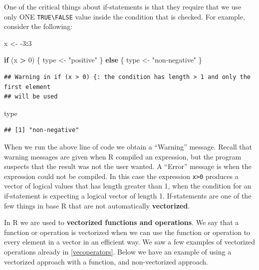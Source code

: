 \documentclass[
]{book}
\newenvironment{Shaded}{\begin{snugshade}}{\end{snugshade}}
\newcommand{\ControlFlowTok}[1]{\textcolor[rgb]{0.13,0.29,0.53}{\textbf{#1}}}
\newcommand{\DecValTok}[1]{\textcolor[rgb]{0.00,0.00,0.81}{#1}}
\newcommand{\NormalTok}[1]{#1}
\newcommand{\OperatorTok}[1]{\textcolor[rgb]{0.81,0.36,0.00}{\textbf{#1}}}
\newcommand{\StringTok}[1]{\textcolor[rgb]{0.31,0.60,0.02}{#1}}
\begin{document}
One of the critical things about if-statements is that they require that we use only ONE \texttt{TRUE\textbackslash{}FALSE} value inside the condition that is checked. For example, consider the following:

\begin{Shaded}
\begin{Highlighting}[]
\NormalTok{x <-}\StringTok{ }\DecValTok{-3}\OperatorTok{:}\DecValTok{3}

\ControlFlowTok{if}\NormalTok{ (x }\OperatorTok{>}\StringTok{ }\DecValTok{0}\NormalTok{) \{}
\NormalTok{    type <-}\StringTok{ "positive"}
\NormalTok{\} }\ControlFlowTok{else}\NormalTok{ \{}
\NormalTok{    type <-}\StringTok{ "non-negative"}
\NormalTok{\}}
\end{Highlighting}
\end{Shaded}

\begin{verbatim}
## Warning in if (x > 0) {: the condition has length > 1 and only the first element
## will be used
\end{verbatim}

\begin{Shaded}
\begin{Highlighting}[]
\NormalTok{type}
\end{Highlighting}
\end{Shaded}

\begin{verbatim}
## [1] "non-negative"
\end{verbatim}

When we run the above line of code we obtain a ``Warning'' message. Recall that warning messages are given when R compiled an expression, but the program suspects that the result was not the user wanted. A ``Error'' message is when the expression could not be compiled. In this case the expression \texttt{x\textgreater{}0} produces a vector of logical values that has length greater than 1, when the condition for an if-statement is expecting a logical vector of length 1. If-statements are one of the few things in base R that are not automatically \textbf{vectorized}.

In R we are used to \textbf{vectorized functions and operations}. We say that a function or operation is vectorized when we can use the function or operation to every element in a vector in an efficient way. We saw a few examples of vectorized operations already in \ref{vecoperators}. Below we have an example of using a vectorized approach with a function, and non-vectorized approach.
\end{document}

